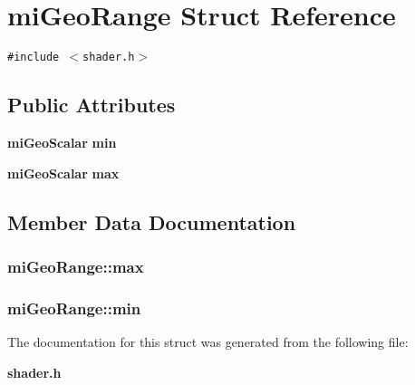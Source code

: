 \section{mi\-Geo\-Range Struct Reference}
\label{structmiGeoRange}
{\tt \#include $<$shader.h$>$}

\subsection*{Public Attributes}
\begin{CompactItemize}
\item 
{\bf mi\-Geo\-Scalar} {\bf min}
\item 
{\bf mi\-Geo\-Scalar} {\bf max}
\end{CompactItemize}


\subsection{Member Data Documentation}
\subsubsection{ {\bf mi\-Geo\-Range::max}}\label{structmiGeoRange_o1}


\subsubsection{ {\bf mi\-Geo\-Range::min}}\label{structmiGeoRange_o0}




The documentation for this struct was generated from the following file:\begin{CompactItemize}
\item 
{\bf shader.h}\end{CompactItemize}

